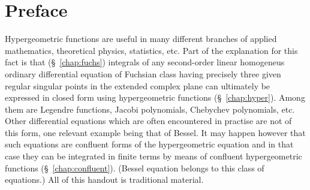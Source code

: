 \chapter*{Preface}

Hypergeometric functions  are useful in many different branches of applied
mathematics, theoretical physics, statistics, etc.  Part of the  explanation for
this fact is that (\S~\ref{chap:fuchs}) integrals of any
second-order linear homogeneus ordinary differential equation of Fuchsian class
having precisely three given regular singular points in the extended complex
plane can ultimately be expressed in closed form using hypergeometric
functions (\S~\ref{chap:hyper}). Among them are Legendre
functions, Jacobi polynomials, Chebychev polynomials, etc.  Other differential
equations which are often encountered in practise are not of this form, one
relevant example being that of Bessel.  It may happen  however  that such
equations are confluent forms of the hypergeometric equation and in that case
they can be integrated in finite terms by means of confluent hypergeometric
functions (\S~\ref{chap:confluent}). (Bessel equation belongs to this class of
equations.) All of this handout is traditional material.

\smallskip

\noindent\textsw{\myLocation, \myTime}


\begin{flushright}
        \myName
\end{flushright}

